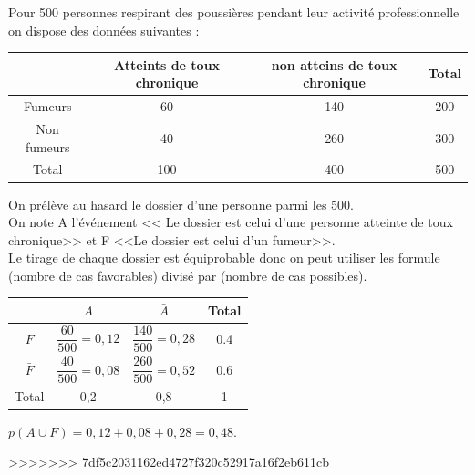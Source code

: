 \documentclass[12pt,a4paper]{article}
\begin{document}
\begin{myex}
	Pour 500 personnes respirant des poussières pendant leur activité professionnelle on dispose des données suivantes :
	
	\begin{small}
		\begin{tabular}{@{\ }c@{\ }|@{\ }c@{\ }|@{\ }c@{\ }|@{\ }c@{\ }|}
			\cline{2-4}
			& Atteints de toux chronique & non atteins de toux chronique & Total \\ \hline
			\multicolumn{1}{|c|}{Fumeurs}     & 60                         & 140                           & 200   \\ \hline
			\multicolumn{1}{|c|}{Non fumeurs} & 40                         & 260                           & 300   \\ \hline
			\multicolumn{1}{|c|}{Total}       & 100                        & 400                           & 500   \\ \hline
		\end{tabular}
	\end{small}
	
	\vspace*{0.5cm}
	
	
	On prélève au hasard le dossier d'une personne parmi les 500.\\
	
	
	On note A l'événement << Le dossier est celui d'une personne atteinte de toux chronique>> et F <<Le dossier est celui d'un fumeur>>.\\
	
	Le tirage de  chaque dossier est équiprobable donc on peut utiliser les formule (nombre de cas favorables) divisé par (nombre de cas possibles).
	
	\begin{small}
		
		\renewcommand{\arraystretch}{2}
		\begin{tabular}{c|c|c|c|}
			\cline{2-4}
			& $A$                      & $\bar{A} $              & Total \\ \hline
			\multicolumn{1}{|c|}{$F$}         & $\dfrac{60}{500}=0,12$ & $\dfrac{140}{500}=0,28$ & 0.4   \\ \hline
			\multicolumn{1}{|c|}{$\bar{F}$} & $\dfrac{40}{500}=0,08$ & $\dfrac{260}{500}=0,52$ & 0.6   \\ \hline
			\multicolumn{1}{|c|}{Total}     & 0,2                    & 0,8                     & 1     \\ \hline
		\end{tabular}
	\end{small}
	
	$p(A \cup F) = 0,12 + 0,08 + 0,28 = 0,48.$
\end{myex}

>>>>>>> 7df5c2031162ed4727f320c52917a16f2eb611cb
	
	
	
\end{document}
